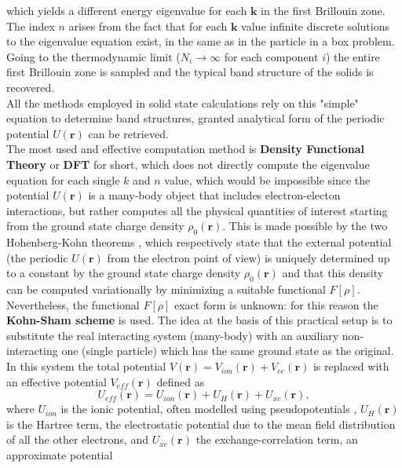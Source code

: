 \documentclass[12pt, a4paper]{report}
\numberwithin{equation}{section}
\begin{document}
which yields a different energy eigenvalue for each $\mathbf{k}$ in the first Brillouin zone. The index $n$ arises from the fact that for 
each $\mathbf{k}$ value infinite discrete solutions to the eigenvalue equation exist, in the same as in the particle in a box problem. Going 
to the thermodynamic limit ($N_i\to\infty$ for each component $i$) the entire first Brillouin zone is sampled and the typical band 
structure of the solids is recovered.\\
All the methods employed in solid state calculations rely on this "simple" equation to determine band structures, granted 
analytical form of the periodic potential $U(\mathbf{r})$ can be retrieved.\\
The most used and effective computation method is \textbf{Density Functional Theory} \cite{thijssen2007computational} or \textbf{DFT} 
for short, which does not directly compute the eigenvalue equation for each single $k$ and $n$ value, which would be impossible since 
the potential $U(\mathbf{r})$ is a many-body object that includes electron-electon interactions, but rather computes all the physical quantities of 
interest starting from the ground state charge density $\rho_0(\mathbf{r})$. This is made possible by the two Hohenberg-Kohn theorems \cite{hohenberg1964inhomogeneous}, 
which respectively state that the external potential (the periodic $U(\mathbf{r})$ from the electron point of view) is uniquely determined 
up to a constant by the ground state charge density $\rho_0(\mathbf{r})$ and that this density can be computed variationally by minimizing a suitable 
functional $F[\rho]$.\\
Nevertheless, the functional $F[\rho]$ exact form is unknown: for this reason the \textbf{Kohn-Sham scheme} \cite{PhysRev.140.A1133} 
is used. The idea at the basis of this practical setup is to substitute the real interacting system (many-body) with an auxiliary non-interacting
one (single particle) which has the same ground state as the original. In this system the total potential $V(\mathbf{r})=V_{ion}(\mathbf{r})+V_{ee}(\mathbf{r})$ is 
replaced with an effective potential $V_{eff}(\mathbf{r})$ defined as
\begin{equation}
    U_{eff}(\mathbf{r})=U_{ion}(\mathbf{r})+U_H(\mathbf{r})+U_{xc}(\mathbf{r}),
\end{equation}
where $U_{ion}$ is the ionic potential, often modelled using pseudopotentials \cite{kerker1980non}, $U_H(\mathbf{r})$ is the Hartree term, the electrostatic 
potential due to the mean field distribution of all the other electrons, and $U_{xc}(\mathbf{r})$ the exchange-correlation term, an approximate potential 
\end{document}
